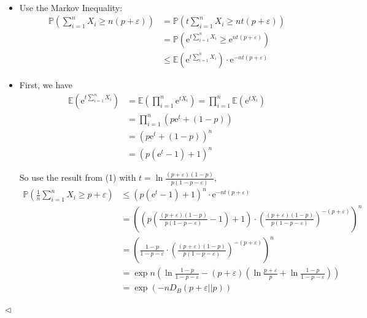 \documentclass[11pt]{article}
\newenvironment{answer}[1][Answer]{\begin{trivlist}
\item[\hskip \labelsep {\bfseries #1.}\hskip \labelsep]}{\hfill$\lhd$\end{trivlist}}
\newcommand\E{\mathbb{E}}
\newcommand\e{\mathrm{e}}
\begin{document}
\begin{answer} ~
\begin{itemize}
    \item [(1)] Use the Markov Inequality:
    \[\begin{aligned}
        \mathbb{P}\left(\sum_{i=1}^n X_i \ge n(p+\varepsilon)\right) &= \mathbb{P}\left(t\sum_{i=1}^n X_i \ge nt(p+\varepsilon)\right) \\
        &= \mathbb{P}\left({\e}^{t\sum_{i=1}^n X_i} \ge {\e}^{nt(p+\varepsilon)}\right) \\
        &\le \E\left({\e}^{t\sum_{i=1}^n X_i}\right) \cdot {\e}^{-nt(p+\varepsilon)}
    \end{aligned}\]
    \item [(2)] First, we have
    \[\begin{aligned}
        \E\left({\e}^{t\sum_{i=1}^n X_i}\right) &= \E\left(\prod_{i=1}^n {\e}^{tX_i}\right) = \prod_{i=1}^n \E\left({\e}^{tX_i}\right) \\
        &= \prod_{i=1}^n \left(p{\e}^t + (1-p)\right) \\
        &= \left(p{\e}^t + (1-p)\right)^n \\
        &= \left(p({\e}^t - 1) + 1\right)^n
    \end{aligned}\]

    So use the result from (1) with $t = \ln\frac{(p+\varepsilon)(1-p)}{p(1-p-\varepsilon)}$, 
    \[\begin{aligned}\mathbb{P}\left(\frac{1}{n}\sum_{i=1}^n X_i \ge p + \varepsilon\right) &\le \left(p({\e}^t - 1) + 1\right)^n \cdot {\e}^{-nt(p+\varepsilon)} \\
    &= \left(\left(p\left(\frac{(p+\varepsilon)(1-p)}{p(1-p-\varepsilon)} - 1\right) + 1\right) \cdot \left(\frac{(p+\varepsilon)(1-p)}{p(1-p-\varepsilon)}\right)^{-(p + \varepsilon)}\right)^n \\
    &= \left(\frac{1-p}{1-p-\varepsilon} \cdot \left(\frac{(p+\varepsilon)(1-p)}{p(1-p-\varepsilon)}\right)^{-(p + \varepsilon)} \right)^n \\
    &= \exp n\left(\ln\frac{1-p}{1-p-\varepsilon} - (p + \varepsilon)\left(\ln\frac{p+\varepsilon}{p} + \ln\frac{1-p}{1-p-\varepsilon}\right)\right) \\
    &= \exp(-n D_B(p+\varepsilon||p))
    \end{aligned}\]


\end{itemize}
\end{answer}
\end{document}
